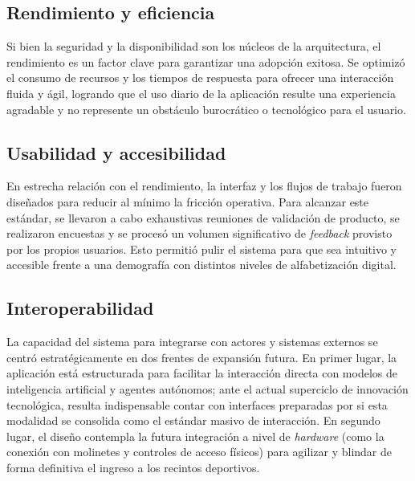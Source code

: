 \subsection{Rendimiento y eficiencia}

Si bien la seguridad y la disponibilidad son los núcleos de la arquitectura, el rendimiento es un factor clave para garantizar una adopción exitosa. Se optimizó el consumo de recursos y los tiempos de respuesta para ofrecer una interacción fluida y ágil, logrando que el uso diario de la aplicación resulte una experiencia agradable y no represente un obstáculo burocrático o tecnológico para el usuario.

\subsection{Usabilidad y accesibilidad}

En estrecha relación con el rendimiento, la interfaz y los flujos de trabajo fueron diseñados para reducir al mínimo la fricción operativa. Para alcanzar este estándar, se llevaron a cabo exhaustivas reuniones de validación de producto, se realizaron encuestas y se procesó un volumen significativo de \textit{feedback} provisto por los propios usuarios. Esto permitió pulir el sistema para que sea intuitivo y accesible frente a una demografía con distintos niveles de alfabetización digital.

\newpage

\subsection{Interoperabilidad}

La capacidad del sistema para integrarse con actores y sistemas externos se centró estratégicamente en dos frentes de expansión futura. En primer lugar, la aplicación está estructurada para facilitar la interacción directa con modelos de inteligencia artificial y agentes autónomos; ante el actual superciclo de innovación tecnológica, resulta indispensable contar con interfaces preparadas por si esta modalidad se consolida como el estándar masivo de interacción. En segundo lugar, el diseño contempla la futura integración a nivel de \textit{hardware} (como la conexión con molinetes y controles de acceso físicos) para agilizar y blindar de forma definitiva el ingreso a los recintos deportivos.
